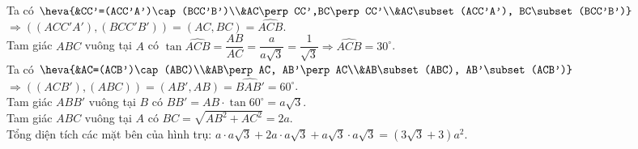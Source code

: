 \begin{ex}
{\begin{itemchoice}
			Ta có $\heva{&CC'=(ACC'A')\cap (BCC'B')\\&AC\perp CC',BC\perp CC'\\&AC\subset (ACC'A'), BC\subset (BCC'B')}$\\
			$\Rightarrow \left((ACC'A'),(BCC'B')\right)=(AC,BC)=\widehat{ACB}$.\\
			Tam giác $ABC$ vuông tại $A$ có  $\tan\widehat{ACB}=\dfrac{AB}{AC}=\dfrac{a}{a\sqrt{3}}=\dfrac{1}{\sqrt{3}}\Rightarrow \widehat{ACB}=30^\circ$.
			\\
			Ta có $\heva{&AC=(ACB')\cap (ABC)\\&AB\perp AC, AB'\perp AC\\&AB\subset (ABC), AB'\subset (ACB')}$\\
			$\Rightarrow \left((ACB'),(ABC) \right)=(AB',AB)=\widehat{BAB'}=60^\circ$.\\
			Tam giác $ABB'$ vuông tại $B$ có  $BB'=AB\cdot \tan 60^\circ=a\sqrt{3}$.\\
			Tam giác $ABC$ vuông tại $A$ có  $BC=\sqrt{AB^2+AC^2}=2a$.\\
			Tổng diện tích các mặt bên của hình trụ: $a\cdot a\sqrt{3}+2a\cdot a\sqrt{3}+a\sqrt{3}\cdot a\sqrt{3}=(3\sqrt{3}+3)a^2$. 
		\end{itemchoice}
	}
\end{ex}
